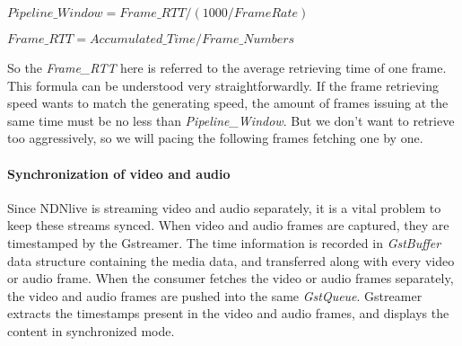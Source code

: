 $Pipeline\_Window =  Frame\_RTT / (1000 / FrameRate) $ 

$Frame\_RTT = Accumulated\_Time / Frame\_Numbers$

So the \textit{Frame\_RTT} here is referred to the average retrieving time of one frame. This formula can be understood very straightforwardly. If the frame retrieving speed wants to match the generating speed, the amount of frames issuing at the same time must be no less than \textit{Pipeline\_Window}. But we don't want to retrieve too aggressively, so we will pacing the following frames fetching one by one.



\paragraph{Synchronization of video and audio}
\vspace{0.1cm}
\label{par:sync}
Since NDNlive is streaming video and audio separately, it is a vital problem to keep these streams synced. When video and audio frames are captured, they are timestamped by the Gstreamer. The time information is recorded in \textit{GstBuffer} data structure containing the media data, and transferred along with every video or audio frame. When the consumer fetches the video or audio frames separately, the video and audio frames are pushed into the same \textit{GstQueue}. Gstreamer extracts the timestamps present in the video and audio frames, and displays the content in synchronized mode. 



